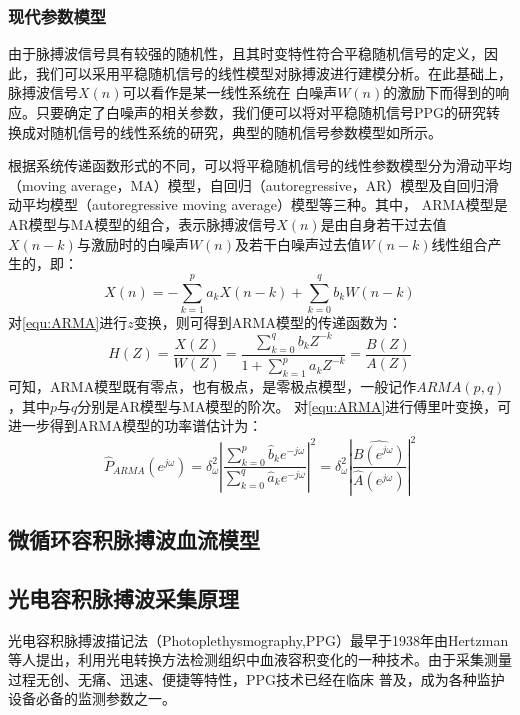 \subsubsection{现代参数模型}
由于脉搏波信号具有较强的随机性，且其时变特性符合平稳随机信号的定义，因此，我们可以采用平稳随机信号的线性模型对脉搏波进行建模分析\cite{TJXHCL,PPGYY}。在此基础上，脉搏波信号$X(n)$可以看作是某一线性系统在
白噪声$W(n)$的激励下而得到的响应。只要确定了白噪声的相关参数，我们便可以将对平稳随机信号PPG的研究转换成对随机信号的线性系统的研究，典型的随机信号参数模型如所示。

根据系统传递函数形式的不同，可以将平稳随机信号的线性参数模型分为滑动平均（moving average，MA）模型，自回归（autoregressive，AR）模型及自回归滑动平均模型（autoregressive moving average）模型等三种。其中，
ARMA模型是AR模型与MA模型的组合，表示脉搏波信号$X(n)$是由自身若干过去值$X(n-k)$与激励时的白噪声$W(n)$及若干白噪声过去值$W(n-k)$线性组合产生的，即：
\begin{equation}
    \label{equ:ARMA}
    X(n)=-\sum_{k=1}^{p}a_{k}X(n-k)+\sum_{k=0}^{q}b_{k}W(n-k)
\end{equation}
对\autoref{equ:ARMA}进行$z$变换，则可得到ARMA模型的传递函数为：
\begin{equation}
    \label{equ:ARMAH}
    H(Z)=\frac{X(Z)}{W(Z)}=\frac{\sum_{k=0}^{q}b_{k}Z^{-k}}{1+\sum_{k=1}^{p}a_{k}Z^{-k}}=\frac{B(Z)}{A(Z)}
\end{equation}
可知，ARMA模型既有零点，也有极点，是零极点模型，一般记作$ARMA(p,q)$，其中$p$与$q$分别是AR模型与MA模型的阶次。
对\autoref{equ:ARMA}进行傅里叶变换，可进一步得到ARMA模型的功率谱估计为\cite{TJXHCL}：
\begin{equation}
    \label{equ:ARMAP}
    \hat{P}_{ARMA}(e^{j\omega} )=
    \delta _{\omega}^2\left |  \frac{\sum_{k=0}^{p}\hat{b}_{k}e^{-j\omega}}{\sum_{k=0}^{q}\hat{a}_{k}e^{-j\omega}}\right |^2
    =\delta _{\omega}^2\left |  \frac{\hat{B(e^{j\omega} )}}{\hat{A}(e^{j\omega} )}\right |^2
\end{equation}

\subsection{微循环容积脉搏波血流模型}

\subsection{光电容积脉搏波采集原理}
光电容积脉搏波描记法（Photoplethysmography,PPG）最早于1938年由Hertzman等人提出，利用光电转换方法检测组织中血液容积变化的一种技术。由于采集测量过程无创、无痛、迅速、便捷等特性，PPG技术已经在临床
普及，成为各种监护设备必备的监测参数之一\cite{ldl,lhc}。

